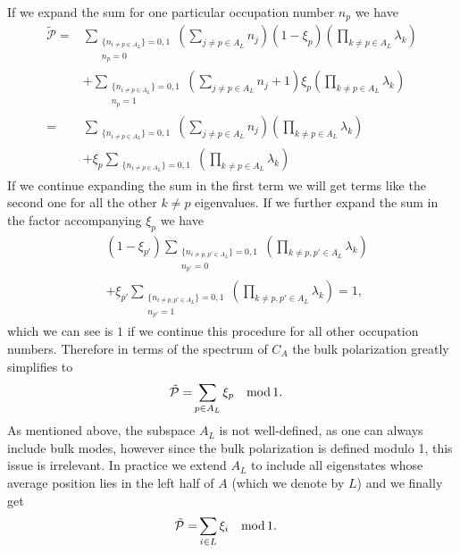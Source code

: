 \documentclass[twocolumn,amsmath,longbibliography,amssymb,superscriptaddress]{revtex4-1}
\begin{document}
If we expand the sum for one particular occupation number $n_p$ we have
\begin{align}
\tilde{\mathcal{P}} =& \sum_{\substack{\{n_{i \neq p \in A_L}\} = 0,1 \\ n_p=0}} \left(\sum_{j\neq p \in A_{L}} n_j \right) (1-\xi_p)\left(\prod_{k \neq p\in A_L} \lambda_k \right) \\
&+ \sum_{\substack{\{n_{i \neq p \in A_L}\} = 0,1 \\ n_p=1}} \left(\sum_{j\neq p \in A_{L}} n_j+1 \right)\xi_p \left(\prod_{k \neq p\in A_L} \lambda_k \right) \\
=& \sum_{\substack{\{n_{i \neq p \in A_L}\} = 0,1 }} \left(\sum_{j\neq p \in A_{L}} n_j \right) \left(\prod_{k \neq p\in A_L} \lambda_k \right) \\
&+ \xi_p \sum_{\substack{\{n_{i \neq p \in A_L}\} = 0,1 }} \left(\prod_{k \neq p\in A_L} \lambda_k \right) 
\end{align}
If we continue expanding the sum in the first term we will get terms like the second one for all the other $k\neq p$ eigenvalues. If we further expand the sum in the factor accompanying $\xi_p$ we have
\begin{align}
&(1-\xi_{p'})\sum_{\substack{\{n_{i \neq p,p' \in A_L}\} = 0,1 \\ n_{p'}=0}} \left(\prod_{k \neq p,p'\in A_L} \lambda_k\right) \\
&+ \xi_{p'}\sum_{\substack{\{n_{i \neq p,p' \in A_L}\} = 0,1 \\ n_{p'}=1}} \left(\prod_{k \neq p,p'\in A_L}\lambda_k\right) =1,
\end{align}
which we can see is $1$ if we continue this procedure for all other occupation numbers. Therefore in terms of the spectrum of $C_A$ the bulk polarization greatly simplifies to 
\begin{align}
\tilde{\mathcal{P}} =& \sum_{p\in A_L}\xi_p  \quad {\rm mod}\, 1.
\end{align}
As mentioned above, the subspace $A_L$ is not well-defined, as one can always include bulk modes, however since the bulk polarization is defined modulo 1, this issue is irrelevant. In practice we extend $A_L$ to include all eigenstates whose average position lies in the left half of $A$ (which we denote by $L$) and we finally get
\begin{align}
\tilde{\mathcal{P}} =& \sum_{i\in L}\xi_i \quad {\rm mod}\, 1.
\label{eq:polarization_left}
\end{align}
\end{document}
